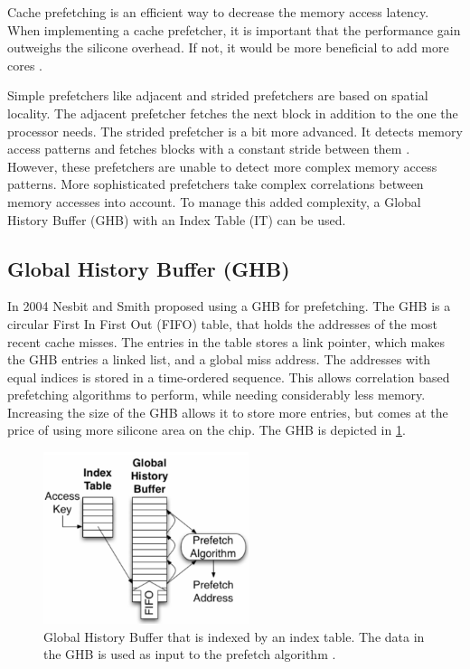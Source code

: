 \documentclass[conference]{IEEEtran}
\begin{document}
Cache prefetching is an efficient way to decrease the memory access latency. When implementing a cache prefetcher, it is important that the performance gain outweighs the silicone overhead. If not, it would be more beneficial to add more cores \cite{b12}.

Simple prefetchers like adjacent and strided prefetchers are based on spatial locality. The adjacent prefetcher fetches the next block in addition to the one the processor needs. The strided prefetcher is a bit more advanced. It detects memory access patterns and fetches blocks with a constant stride between them \cite{b6}.  However, these prefetchers are unable to detect more complex memory access patterns. More sophisticated prefetchers take complex correlations between memory accesses into account. To manage this added complexity, a Global History Buffer (GHB) with an Index Table (IT) can be used. 

\subsection{Global History Buffer (GHB)}
In 2004 Nesbit and Smith \cite{b1} proposed using a GHB for prefetching. The GHB is a circular First In First Out (FIFO) table, that holds the addresses of the most recent cache misses. The entries in the table stores a link pointer, which makes the GHB entries a linked list, and a global miss address. The addresses with equal indices is stored in a time-ordered sequence. This allows correlation based prefetching algorithms to perform, while needing considerably less memory. Increasing the size of the GHB allows it to store more entries, but comes at the price of using more silicone area on the chip. The GHB is depicted in \cref{fig:GHB}. 

\begin{figure}[H]
    \centering
     \includegraphics[width=6cm]{assets/GHB-prefetch-structure.png}
    \vspace{-2mm}
    \caption{Global History Buffer that is indexed by an index table. The data in the GHB is used as input to the prefetch algorithm \cite{b1}.}
    \label{fig:GHB}
\end{figure}
\end{document}
